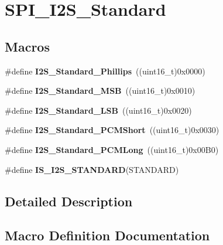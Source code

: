 \hypertarget{group___s_p_i___i2_s___standard}{}\section{S\+P\+I\+\_\+\+I2\+S\+\_\+\+Standard}
\label{group___s_p_i___i2_s___standard}
\subsection*{Macros}
\begin{DoxyCompactItemize}
\item 
\mbox{\label{group___s_p_i___i2_s___standard_gacdb89d66a2a941924ff4b7a8d14884f9}} 
\#define {\bfseries I2\+S\+\_\+\+Standard\+\_\+\+Phillips}~((uint16\+\_\+t)0x0000)
\item 
\mbox{\label{group___s_p_i___i2_s___standard_gae716cfa7e031affc37fe65dd80b0e6f4}} 
\#define {\bfseries I2\+S\+\_\+\+Standard\+\_\+\+M\+SB}~((uint16\+\_\+t)0x0010)
\item 
\mbox{\label{group___s_p_i___i2_s___standard_ga88bc9001a13b95a0844d81fea2080df6}} 
\#define {\bfseries I2\+S\+\_\+\+Standard\+\_\+\+L\+SB}~((uint16\+\_\+t)0x0020)
\item 
\mbox{\label{group___s_p_i___i2_s___standard_gaaf59e587048ff632037dfc9875ab4c7b}} 
\#define {\bfseries I2\+S\+\_\+\+Standard\+\_\+\+P\+C\+M\+Short}~((uint16\+\_\+t)0x0030)
\item 
\mbox{\label{group___s_p_i___i2_s___standard_gaf79cb88702059506d876dbd776d7a136}} 
\#define {\bfseries I2\+S\+\_\+\+Standard\+\_\+\+P\+C\+M\+Long}~((uint16\+\_\+t)0x00\+B0)
\item 
\#define {\bfseries I\+S\+\_\+\+I2\+S\+\_\+\+S\+T\+A\+N\+D\+A\+RD}(S\+T\+A\+N\+D\+A\+RD)
\end{DoxyCompactItemize}


\subsection{Detailed Description}


\subsection{Macro Definition Documentation}
\mbox{\label{group___s_p_i___i2_s___standard_ga826b9ddb34520b8fa64c2b65c9bfd528}} 
